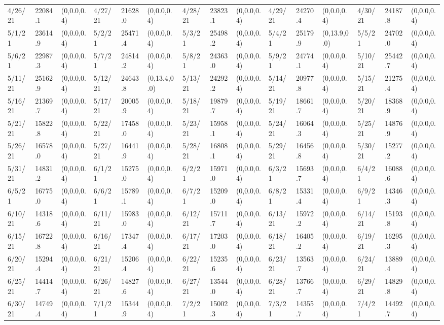 \documentclass[12pt]{article}
\begin{document}
\begin{table}
\begin{center}
\begin{tabular}{p{15pt}p{15pt}p{25pt}p{15pt}p{15pt}p{25pt}p{15pt}p{15pt}p{25pt}p{15pt}p{15pt}p{25pt}p{15pt}p{15pt}p{25pt}}
                4/26/21&22084.1&(0,0.0,0.4)&4/27/21&21628.0&(0,0.0,0.4)&4/28/21&23823.1&(0,0.0,0.4)&4/29/21&24270.4&(0,0.0,0.4)&4/30/21&24187.8&(0,0.0,0.4)\\
                5/1/21&23614.9&(0,0.0,0.4)&5/2/21&25471.4&(0,0.0,0.4)&5/3/21&25498.2&(0,0.0,0.4)&5/4/21&25179.9&(0,13.9,0.0)&5/5/21&24702.0&(0,0.0,0.4)\\
                5/6/21&22987.3&(0,0.0,0.4)&5/7/21&24814.2&(0,0.0,0.4)&5/8/21&24363.0&(0,0.0,0.4)&5/9/21&24774.1&(0,0.0,0.4)&5/10/21&25442.7&(0,0.0,0.4)\\
                5/11/21&25162.9&(0,0.0,0.4)&5/12/21&24643.8&(0,13.4,0.0)&5/13/21&24292.2&(0,0.0,0.4)&5/14/21&20977.8&(0,0.0,0.4)&5/15/21&21275.4&(0,0.0,0.4)\\
                5/16/21&21369.7&(0,0.0,0.4)&5/17/21&20005.9&(0,0.0,0.4)&5/18/21&19879.7&(0,0.0,0.4)&5/19/21&18661.7&(0,0.0,0.4)&5/20/21&18368.9&(0,0.0,0.4)\\
                5/21/21&15822.8&(0,0.0,0.4)&5/22/21&17458.0&(0,0.0,0.4)&5/23/21&15958.1&(0,0.0,0.4)&5/24/21&16064.3&(0,0.0,0.4)&5/25/21&14876.9&(0,0.0,0.4)\\
                5/26/21&16578.0&(0,0.0,0.4)&5/27/21&16441.9&(0,0.0,0.4)&5/28/21&16808.1&(0,0.0,0.4)&5/29/21&16456.8&(0,0.0,0.4)&5/30/21&15277.2&(0,0.0,0.4)\\
                5/31/21&14831.2&(0,0.0,0.4)&6/1/21&15275.0&(0,0.0,0.4)&6/2/21&15971.0&(0,0.0,0.4)&6/3/21&15693.7&(0,0.0,0.4)&6/4/21&16088.6&(0,0.0,0.4)\\
                6/5/21&16775.0&(0,0.0,0.4)&6/6/21&15789.1&(0,0.0,0.4)&6/7/21&15209.0&(0,0.0,0.4)&6/8/21&15331.4&(0,0.0,0.4)&6/9/21&14346.3&(0,0.0,0.4)\\
                6/10/21&14318.6&(0,0.0,0.4)&6/11/21&15983.0&(0,0.0,0.4)&6/12/21&15711.7&(0,0.0,0.4)&6/13/21&15972.2&(0,0.0,0.4)&6/14/21&15193.8&(0,0.0,0.4)\\
                6/15/21&16722.8&(0,0.0,0.4)&6/16/21&17347.4&(0,0.0,0.4)&6/17/21&17203.0&(0,0.0,0.4)&6/18/21&16405.2&(0,0.0,0.4)&6/19/21&16295.3&(0,0.0,0.4)\\
                6/20/21&15294.4&(0,0.0,0.4)&6/21/21&15206.4&(0,0.0,0.4)&6/22/21&15235.6&(0,0.0,0.4)&6/23/21&13563.7&(0,0.0,0.4)&6/24/21&13889.4&(0,0.0,0.4)\\
                6/25/21&14414.7&(0,0.0,0.4)&6/26/21&14827.6&(0,0.0,0.4)&6/27/21&13544.0&(0,0.0,0.4)&6/28/21&13766.7&(0,0.0,0.4)&6/29/21&14829.8&(0,0.0,0.4)\\
                6/30/21&14749.4&(0,0.0,0.4)&7/1/21&15344.9&(0,0.0,0.4)&7/2/21&15002.3&(0,0.0,0.4)&7/3/21&14355.7&(0,0.0,0.4)&7/4/21&14492.7&(0,0.0,0.4)\\

\end{tabular}
\end{center}
\end{table}
\end{document}
